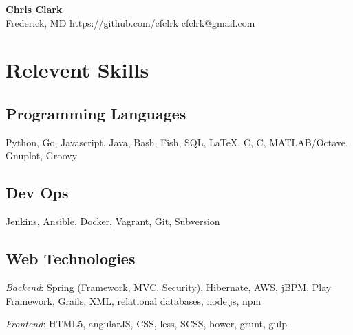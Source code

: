 \documentclass[a4paper,11pt]{article}
\newcommand{\CC}{C\nolinebreak\hspace{-.05em}\raisebox{.4ex}{\tiny\bf
    +}\nolinebreak\hspace{-.10em}\raisebox{.4ex}{\tiny\bf +}}
\def\CC{{C\nolinebreak[4]\hspace{-.05em}\raisebox{.4ex}{\tiny\bf ++}}}
\begin{document}
\begin{center}
  {\sffamily \huge \textbf{Chris Clark}} \\
  Frederick, MD \enspace\textopenbullet\enspace
  https://github.com/cfclrk \enspace\textopenbullet\enspace
  cfclrk@gmail.com
\end{center}

\vspace{-9pt}


  \section*{Relevent Skills}

  \begin{multicols}{2}
    \raggedright

    \subsection*{Programming Languages}

    Python, Go, Javascript, Java, Bash, Fish, SQL, \LaTeX, C, \CC, MATLAB/Octave, Gnuplot, Groovy

    \subsection*{Dev Ops}

    Jenkins, Ansible, Docker, Vagrant, Git, Subversion
    \vfill
    \columnbreak

    \subsection*{Web Technologies}

    \textsl{Backend}: Spring (Framework, MVC, Security), Hibernate, AWS, jBPM, Play Framework,
    Grails, XML, relational databases, node.js, npm

    \textsl{Frontend}: HTML5, angularJS, CSS, less, SCSS, bower, grunt, gulp


  \end{multicols}

\end{document}
